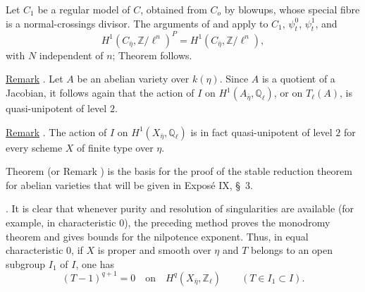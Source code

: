 Let $C_1$ be a regular model of $C$, obtained from $C_o$ by blowups, whose
special fibre is a normal-crossings divisor. The arguments of  and
 apply to $C_1$, $\psi_t^0$, $\psi_t^1$, and
\[
H^1(C_{\bar\eta},\mathbb Z/\ell^n)^P
=H^1(C_{\bar\eta},\mathbb Z/\ell^n),
\]
with $N$ independent of $n$; Theorem  follows.

\underline{Remark} . Let $A$ be an abelian variety over $k(\eta)$.
Since $A$ is a quotient of a Jacobian, it follows again that the action
of $I$ on $H^1(A_{\bar\eta},\mathbb Q_\ell)$, or on $T_\ell(A)$, is
quasi-unipotent of level $2$.

\underline{Remark} . The action of $I$ on
$H^1(X_{\bar\eta},\mathbb Q_\ell)$ is in fact quasi-unipotent of level
$2$ for every scheme $X$ of finite type over $\eta$.

Theorem  (or Remark ) is the basis for the proof of the stable
reduction theorem for abelian varieties that will be given in Expos\'{e}
IX, \S~3.

. It is clear that whenever purity and resolution of singularities
are available (for example, in characteristic $0$), the preceding method
proves the monodromy theorem and gives bounds for the nilpotence
exponent. Thus, in equal characteristic $0$, if $X$ is proper and smooth
over $\eta$ and $T$ belongs to an open subgroup $I_1$ of $I$, one has
\begin{equation*}
(T-1)^{q+1}=0
\quad\text{on}\quad H^q(X_{\bar\eta},\mathbb Z_\ell)
\qquad(T\in I_1\subset I).
\end{equation*}

